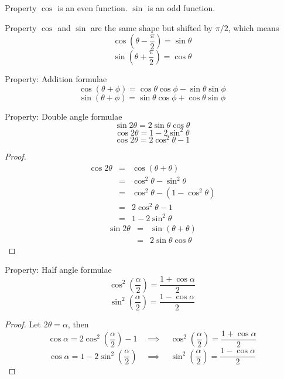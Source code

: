 \begin{thing}{Property}
$\cos$ is an even function. $\sin$ is an odd function.
\end{thing}

\begin{thing}{Property}
$\cos$ and $\sin$ are the same shape but shifted by $\pi/2$, which means
$$\cos\left(\theta-\frac{\pi}{2}\right)=\sin\theta$$
$$\sin\left(\theta+\frac{\pi}{2}\right)=\cos\theta$$
\end{thing}

\begin{thing}{Property: Addition formulae}
$$\cos(\theta+\phi)=\cos\theta\cos\phi-\sin\theta\sin\phi$$
$$\sin(\theta+\phi)=\sin\theta\cos\phi+\cos\theta\sin\phi$$
\end{thing}

\begin{thing}{Property: Double angle formulae}
$$\sin2\theta = 2\sin\theta\cos\theta$$
$$\cos2\theta = 1-2\sin^2\theta$$
$$\cos2\theta = 2\cos^2\theta-1$$
\begin{proof}
\begin{eqnarray*}
\cos 2\theta&=&\cos(\theta+\theta) \nonumber \\
&=& \cos^2\theta-\sin^2\theta \nonumber \\
&=& \cos^2\theta -(1-\cos^2\theta) \nonumber \\
&=& 2\cos^2\theta - 1 \nonumber \\
&=& 1-2\sin^2\theta
\end{eqnarray*}
\begin{eqnarray*}
\sin2\theta &=& \sin(\theta+\theta) \nonumber \\
&=& 2\sin\theta\cos\theta
\end{eqnarray*}
\end{proof}
\end{thing}

\begin{thing}{Property: Half angle formulae}
$$\cos^2\left(\frac{\alpha}{2}\right)=\frac{1+\cos\alpha}{2}$$
$$\sin^2\left(\frac{\alpha}{2}\right)=\frac{1-\cos\alpha}{2}$$
\begin{proof}
Let $2\theta=\alpha$, then
\begin{equation*}
\cos\alpha = 2\cos^2\left(\frac{\alpha}{2}\right) - 1 \quad \implies \quad \cos^2\left(\frac{\alpha}{2}\right)=\frac{1+\cos\alpha}{2}
\end{equation*}
\begin{equation*}
\cos\alpha = 1- 2\sin^2\left(\frac{\alpha}{2}\right) \quad \implies \quad \sin^2\left(\frac{\alpha}{2}\right)=\frac{1-\cos\alpha}{2}
\end{equation*}
\end{proof}
\end{thing}

